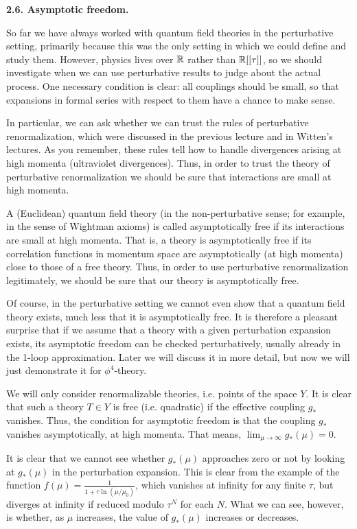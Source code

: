 {\bf 2.6. Asymptotic freedom.}

So far we have always worked with quantum field theories in 
the perturbative setting, primarily because this was the only setting 
in which we could define and study them. However, physics lives over 
$\Bbb R$ rather than $\Bbb R[[\tau]]$, so we should investigate when we can use
perturbative results to judge about the actual process. One 
necessary condition is clear: all couplings should be small,
so that expansions in formal series with respect to them have a chance 
to make sense. 

In particular, we can ask whether we can trust the rules of perturbative
renormalization, which were discussed in the previous lecture and 
in Witten's lectures. As you remember, these rules tell how to handle 
divergences arising at high momenta (ultraviolet divergences).  
Thus, in order to trust the theory of perturbative renormalization 
we should be sure that interactions are small at high momenta. 

A (Euclidean) quantum field theory (in the non-perturbative sense; 
for example, in the sense of Wightman axioms) is called 
asymptotically free if its interactions 
are small at high momenta. That is, 
a theory is asymptotically free if its correlation functions 
in momentum space are asymptotically 
(at high momenta) close to those of a free theory. 
Thus, in order to use perturbative renormalization legitimately,
we should be sure that our theory is asymptotically free. 

Of course, in the perturbative  setting we cannot 
even show that a quantum field theory exists, much less that 
it is asymptotically free. It is therefore a pleasant surprise that
if we assume that a theory with a given perturbation expansion 
exists, its asymptotic freedom can be checked perturbatively, 
usually already in the 1-loop approximation.
Later we will discuss it in more detail, but now we will just 
demonstrate it for $\phi^4$-theory. 

We will only consider renormalizable theories, i.e. points of the space $Y$. 
It is clear that such a theory $T\in Y$ is free
(i.e. quadratic) if the effective coupling $g_*$ 
vanishes.
Thus, the condition for asymptotic freedom is that 
the coupling $g_*$ vanishes asymptotically, at high momenta. 
That means, $\lim_{\mu\to\infty}g_*(\mu)=0$.

It is clear that we cannot see whether $g_*(\mu)$ approaches zero 
or not by looking 
at $g_*(\mu)$ in the perturbation expansion. 
This is clear from the example of the function
$f(\mu)=\frac{1}{1+\tau\ln(\mu/\mu_0)}$, which vanishes at infinity for any 
finite $\tau$, but diverges at infinity if reduced modulo $\tau^N$ for 
each $N$. What we can see, however, is whether, as $\mu$ increases, 
the value of $g_*(\mu)$ increases or decreases.

